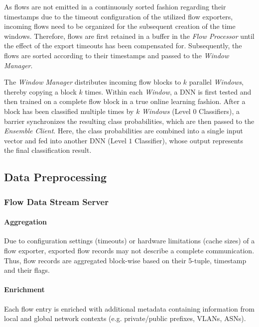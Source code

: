 \documentclass[conference]{IEEEtran}
\begin{document}
As flows are not emitted in a continuously sorted fashion regarding their timestamps due to the timeout configuration of the utilized flow exporters, incoming flows need to be organized for the subsequent creation of the time windows. Therefore, flows are first retained in a buffer in the \textit{Flow Processor} until the effect of the export timeouts has been compensated for. Subsequently, the flows are sorted according to their timestamps and passed to the \textit{Window Manager}.

The \textit{Window Manager} distributes incoming flow blocks to $k$ parallel \textit{Windows}, thereby copying a block $k$ times. Within each \textit{Window}, a DNN is first tested and then trained on a complete flow block in a true online learning fashion. After a block has been classified multiple times by $k$ \textit{Windows} (Level $0$ Classifiers), a barrier synchronizes the resulting class probabilities, which are then passed to the \textit{Ensemble Client}. Here, the class probabilities are combined into a single input vector and fed into another DNN (Level $1$ Classifier), whose output represents the final classification result. 

\subsection{Data Preprocessing}\label{sec:data_preprocessing}

\subsubsection{Flow Data Stream Server}\label{sec:flow_data_stream_server}

\paragraph{Aggregation}
Due to configuration settings (timeouts) or hardware limitations (cache sizes) of a flow exporter, exported flow records may not describe a complete communication. Thus, flow records are aggregated block-wise based on their 5-tuple, timestamp and their flags.

\paragraph{Enrichment}
Each flow entry is enriched with additional metadata containing information from local and global network contexts (e.g. private/public prefixes, VLANs, ASNs).
\end{document}
